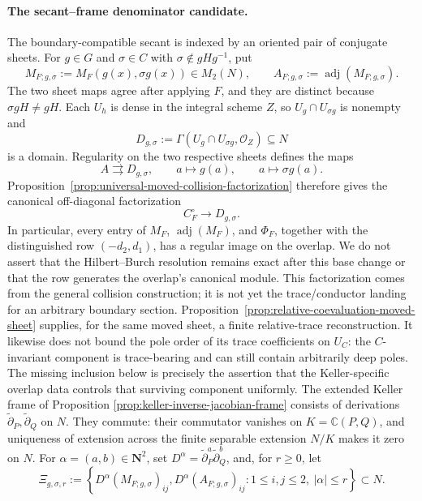 \documentclass[11pt]{article}
\theoremstyle{remark}
\theoremstyle{definition}
\newcommand{\C}{\mathbb C}
\begin{document}
\paragraph{The secant--frame denominator candidate.}
The boundary-compatible secant is indexed by an oriented pair of conjugate
sheets.  For \(g\in G\) and \(\sigma\in C\) with
\(\sigma\notin gHg^{-1}\), put
\[
  M_{F;g,\sigma}:=M_F(g(x),\sigma g(x))\in M_2(N),
  \qquad
  A_{F;g,\sigma}:=\operatorname{adj}(M_{F;g,\sigma}).
\]
The two sheet maps agree after applying \(F\), and they are distinct because
\(\sigma gH\ne gH\).  Each \(U_h\) is dense in the integral scheme \(Z\),
so \(U_g\cap U_{\sigma g}\) is nonempty and
\[
  D_{g,\sigma}:=
  \Gamma(U_g\cap U_{\sigma g},\mathcal O_Z)\subseteq N
\]
is a domain.  Regularity on the two respective sheets defines the maps
\[
  A\rightrightarrows D_{g,\sigma},
  \qquad
  a\longmapsto g(a),
  \qquad
  a\longmapsto\sigma g(a).
\]
Proposition~\ref{prop:universal-moved-collision-factorization} therefore
gives the canonical off-diagonal factorization
\[
  C_F^\circ\longrightarrow
  D_{g,\sigma}.
\]
In particular, every entry of \(M_F\), \(\operatorname{adj}(M_F)\), and
\(\Phi_F\), together with the distinguished row \((-d_2,d_1)\), has a
regular image on the overlap.  We do not assert that the Hilbert--Burch
resolution remains exact after this base change or that the row generates
the overlap's canonical module.  This factorization comes from the general
collision construction; it is not yet the trace/conductor landing for an
arbitrary boundary section.
Proposition~\ref{prop:relative-coevaluation-moved-sheet} supplies, for the
same moved sheet, a finite relative-trace reconstruction.  It likewise does
not bound the pole order of its trace coefficients on \(U_C\): the
\(C\)-invariant component is trace-bearing and can still contain arbitrarily
deep poles.  The missing inclusion below is precisely the assertion that the
Keller-specific overlap data controls that surviving component uniformly.
The extended Keller frame of Proposition
\ref{prop:keller-inverse-jacobian-frame} consists of derivations
\(\widetilde\partial_P,\widetilde\partial_Q\) on \(N\).  They commute:
their commutator vanishes on \(K=\C(P,Q)\), and uniqueness of extension
across the finite separable extension \(N/K\) makes it zero on \(N\).  For
\(\alpha=(a,b)\in\mathbf N^2\), set
\(D^\alpha=\widetilde\partial_P^a
\widetilde\partial_Q^b\), and, for \(r\geq0\), let
\[
  \Xi_{g,\sigma,r}:=
  \left\{
    D^\alpha(M_{F;g,\sigma})_{ij},
    D^\alpha(A_{F;g,\sigma})_{ij}
    :1\leq i,j\leq2,\ |\alpha|\leq r
  \right\}\subset N.
\]
\end{document}
